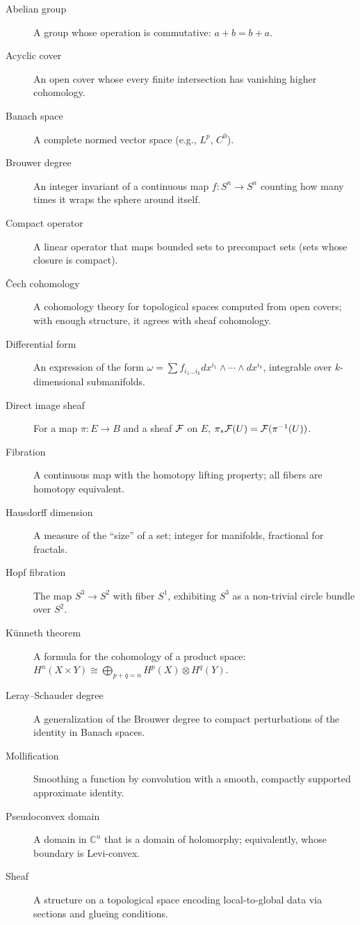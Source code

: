 \begin{description}
    \item[Abelian group] A group whose operation is commutative: $a + b = b + a$.
    \item[Acyclic cover] An open cover whose every finite intersection has vanishing higher cohomology.
    \item[Banach space] A complete normed vector space (e.g., $L^p$, $C^0$).
    \item[Brouwer degree] An integer invariant of a continuous map $f: S^n \to S^n$ counting how many times it wraps the sphere around itself.
    \item[Compact operator] A linear operator that maps bounded sets to precompact sets (sets whose closure is compact).
    \item[{\v C}ech cohomology] A cohomology theory for topological spaces computed from open covers; with enough structure, it agrees with sheaf cohomology.
    \item[Differential form] An expression of the form $\omega = \sum f_{i_1\dots i_k} dx^{i_1} \wedge \cdots \wedge dx^{i_k}$, integrable over $k$-dimensional submanifolds.
    \item[Direct image sheaf] For a map $\pi: E \to B$ and a sheaf $\mathcal{F}$ on $E$, $\pi_* \mathcal{F}(U) = \mathcal{F}(\pi^{-1}(U))$.
    \item[Fibration] A continuous map with the homotopy lifting property; all fibers are homotopy equivalent.
    \item[Hausdorff dimension] A measure of the ``size'' of a set; integer for manifolds, fractional for fractals.
    \item[Hopf fibration] The map $S^3 \to S^2$ with fiber $S^1$, exhibiting $S^3$ as a non-trivial circle bundle over $S^2$.
    \item[K{\"u}nneth theorem] A formula for the cohomology of a product space: $H^n(X \times Y) \cong \bigoplus_{p+q=n} H^p(X) \otimes H^q(Y)$.
    \item[Leray--Schauder degree] A generalization of the Brouwer degree to compact perturbations of the identity in Banach spaces.
    \item[Mollification] Smoothing a function by convolution with a smooth, compactly supported approximate identity.
    \item[Pseudoconvex domain] A domain in $\mathbb{C}^n$ that is a domain of holomorphy; equivalently, whose boundary is Levi-convex.
    \item[Sheaf] A structure on a topological space encoding local-to-global data via sections and glueing conditions.

\end{description}
